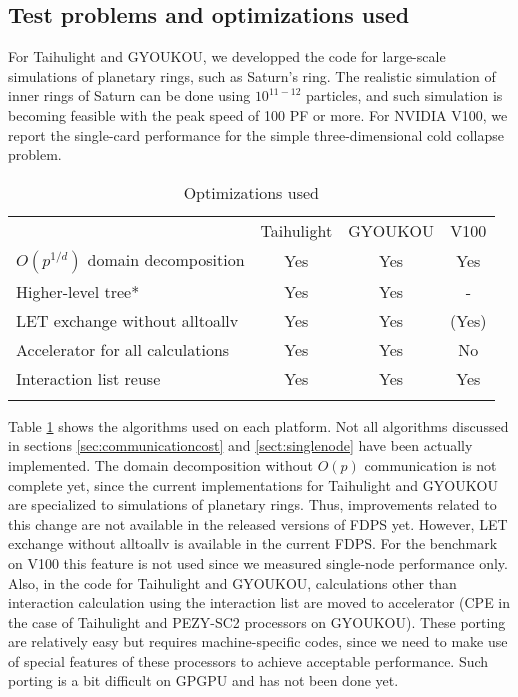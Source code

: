 \subsection{Test problems and optimizations used}

For Taihulight and GYOUKOU, we developped  the code for large-scale
simulations of planetary rings, such as Saturn's ring. The realistic
simulation of inner rings of Saturn can be done using $10^{11-12}$
particles, and such simulation is becoming feasible with the peak
speed of 100 PF or more. For NVIDIA V100, we report the single-card
performance for the simple three-dimensional cold collapse problem.

\begin{table}
\caption{Optimizations used}
\label{tab:optimizationss}       %
\begin{tabular}{lccc}
\hline\noalign{\smallskip}
& Taihulight & GYOUKOU & V100\\
\noalign{\smallskip}\hline\noalign{\smallskip}
$O(p^{1/d})$ domain decomposition & Yes & Yes & Yes \\
Higher-level tree* & Yes & Yes & - \\
LET exchange without alltoallv  & Yes & Yes & (Yes) \\
Accelerator for all calculations & Yes & Yes & No \\
Interaction list reuse & Yes & Yes & Yes \\
\noalign{\smallskip}\hline
\end{tabular}
\end{table}

Table \ref{tab:optimizationss} shows the algorithms used on each
platform. Not all algorithms discussed in sections
\ref{sec:communicationcost} and  \ref{sect:singlenode} have been
actually implemented. 
The domain decomposition without $O(p)$ communication is not complete
yet, since the current implementations  for Taihulight and GYOUKOU are
specialized to simulations of planetary rings. Thus, improvements
related to this change are not available in the released versions
of FDPS yet. However, LET exchange without alltoallv is available in
the current FDPS. For the benchmark on V100 this feature is not used
since we measured single-node performance only.
Also, in the code for Taihulight and GYOUKOU, calculations other than
interaction calculation using the interaction list are moved to
accelerator (CPE in the case of Taihulight and PEZY-SC2 processors on
GYOUKOU). These porting are relatively easy but requires 
machine-specific codes, since we need to make use of special
features of these processors to achieve acceptable performance. Such
porting is a bit difficult on GPGPU and has not been done yet.



